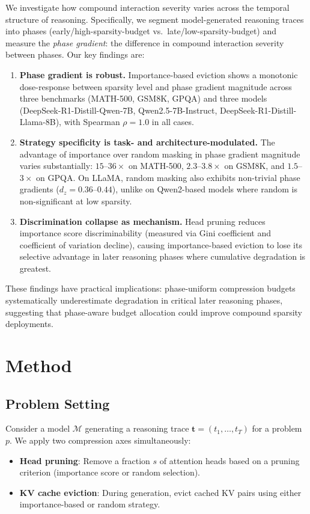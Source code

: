 \documentclass[11pt]{article}
\begin{document}
We investigate how compound interaction severity varies across the temporal structure of reasoning. Specifically, we segment model-generated reasoning traces into phases (early/high-sparsity-budget vs.\ late/low-sparsity-budget) and measure the \emph{phase gradient}: the difference in compound interaction severity between phases. Our key findings are:

\begin{enumerate}
    \item \textbf{Phase gradient is robust.} Importance-based eviction shows a monotonic dose-response between sparsity level and phase gradient magnitude across three benchmarks (MATH-500, GSM8K, GPQA) and three models (DeepSeek-R1-Distill-Qwen-7B, Qwen2.5-7B-Instruct, DeepSeek-R1-Distill-Llama-8B), with Spearman $\rho=1.0$ in all cases.

    \item \textbf{Strategy specificity is task- and architecture-modulated.} The advantage of importance over random masking in phase gradient magnitude varies substantially: $15$--$36\times$ on MATH-500, $2.3$--$3.8\times$ on GSM8K, and $1.5$--$3\times$ on GPQA. On LLaMA, random masking also exhibits non-trivial phase gradients ($d_z = 0.36$--$0.44$), unlike on Qwen2-based models where random is non-significant at low sparsity.

    \item \textbf{Discrimination collapse as mechanism.} Head pruning reduces importance score discriminability (measured via Gini coefficient and coefficient of variation decline), causing importance-based eviction to lose its selective advantage in later reasoning phases where cumulative degradation is greatest.
\end{enumerate}

These findings have practical implications: phase-uniform compression budgets systematically underestimate degradation in critical later reasoning phases, suggesting that phase-aware budget allocation could improve compound sparsity deployments.

\section{Method}

\subsection{Problem Setting}

Consider a model $\mathcal{M}$ generating a reasoning trace $\mathbf{t} = (t_1, \ldots, t_T)$ for a problem $p$. We apply two compression axes simultaneously:
\begin{itemize}
    \item \textbf{Head pruning}: Remove a fraction $s$ of attention heads based on a pruning criterion (importance score or random selection).
    \item \textbf{KV cache eviction}: During generation, evict cached KV pairs using either importance-based or random strategy.
\end{itemize}
\end{document}
